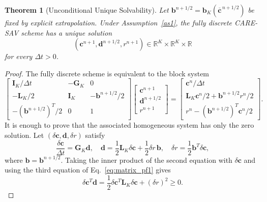 \documentclass[10pt,reqno]{amsart}
\newtheorem{thm}{\bf Theorem}
\newenvironment{theorem}{\begin{thm}} {\end{thm}}
\theoremstyle{remark}
\theoremstyle{definition}
\begin{document}
\begin{theorem}[Unconditional Unique Solvability]
\label{thm:uus}
  Let $\boldsymbol b^{n+1/2}=\boldsymbol b_K(\overline{\boldsymbol c}^{\,n+1/2})$ be fixed by explicit extrapolation. Under Assumption~\ref{as1}, the fully discrete CARE-SAV scheme has a unique solution
  $$
    (\boldsymbol c^{n+1},\boldsymbol d^{n+1/2},r^{n+1}) \in\mathbb R^K\times\mathbb R^K\times\mathbb R
  $$
  for every $\Delta t>0$.
\end{theorem}
\begin{proof}
  The fully discrete scheme is equivalent to the block system
  \begin{equation}
    \label{eq:square_system_pf1}
    \begin{bmatrix}
  \boldsymbol{I}_K/\Delta t&-\boldsymbol{G}_K&0\\
  -\boldsymbol{L}_K/2&\boldsymbol{I}_K&-\boldsymbol b^{n+1/2}/2\\
  -(\boldsymbol b^{n+1/2})^{T}/2&0&1
  \end{bmatrix}
  \begin{bmatrix}
  \boldsymbol c^{n+1}\\
  \boldsymbol d^{n+1/2}\\
  r^{n+1}
  \end{bmatrix}
  =
  \begin{bmatrix}
  \boldsymbol c^n/\Delta t\\
  \boldsymbol{L}_K\boldsymbol c^n/2+\boldsymbol b^{n+1/2}r^n/2\\
  r^n-(\boldsymbol b^{n+1/2})^{T}\boldsymbol c^n/2
  \end{bmatrix}.
  \end{equation}
  It is enough to prove that the associated homogeneous system has only the zero solution. Let $(\delta\boldsymbol c,\boldsymbol d,\delta r)$ satisfy
  \begin{equation}
  \label{eq:matrix_pf1}
    \frac{\delta\boldsymbol c}{\Delta t}=\boldsymbol{G}_K\boldsymbol d,
    \quad
    \boldsymbol d=\frac12\boldsymbol{L}_K\delta\boldsymbol c +\frac12\delta r\,\boldsymbol b,
    \quad
    \delta r=\frac12\boldsymbol b^{T}\delta\boldsymbol c,
  \end{equation}
  where $\boldsymbol b=\boldsymbol b^{n+1/2}$. Taking the inner product of the second equation with $\delta\boldsymbol c$ and using the third equation of Eq.~\eqref{eq:matrix_pf1} gives
  \begin{equation}
  \label{eq:uus_pf1}
    \delta\boldsymbol c^{T}\boldsymbol d =\frac12\delta\boldsymbol c^{T}\boldsymbol{L}_K\delta\boldsymbol c +(\delta r)^2 \ge 0.

\end{equation}
\end{proof}
\end{document}
